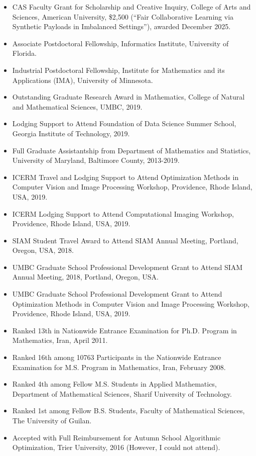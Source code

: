 \documentclass[letterpaper,11pt]{article}
\newcommand{\resitem}[1]{\item #1 \vspace{-2pt}}
\newcommand{\resheading}[1]{\par\vspace{0.6em}\noindent{\large\textbf{#1}}\par\vspace{0.25em}}
\begin{document}
\resheading{\LARGE{Honors and Awards}}
	\begin{itemize}
 \resitem{CAS Faculty Grant for Scholarship and Creative Inquiry, College of Arts and Sciences, American University, \$2{,}500 (``Fair Collaborative Learning via Synthetic Payloads in Imbalanced Settings''), awarded December 2025.}

 \resitem{Associate  Postdoctoral Fellowship, Informatics Institute, University of Florida.}
 
 \resitem{Industrial Postdoctoral Fellowship, Institute for Mathematics and its Applications (IMA), University of Minnesota.}

   \resitem{Outstanding Graduate Research Award in Mathematics, College of Natural and Mathematical Sciences, UMBC, 2019.}

\resitem{Lodging Support to Attend Foundation of Data Science Summer School,  Georgia Institute of Technology, 2019.}
        \resitem{Full Graduate Assistantship from Department of Mathematics and Statistics, University of Maryland, Baltimore County, 2013-2019.}
        \resitem{ICERM Travel and Lodging Support to Attend Optimization Methods in Computer Vision and Image Processing Workshop, Providence, Rhode Island, USA, 2019.}
        \resitem{ICERM Lodging Support to Attend Computational Imaging Workshop, Providence, Rhode Island, USA, 2019.}
        \resitem{SIAM Student Travel Award to Attend  SIAM Annual Meeting, Portland, Oregon, USA, 2018.}
        \resitem{UMBC Graduate School Professional Development Grant to  Attend SIAM Annual Meeting, 2018, Portland, Oregon, USA.}
\resitem{UMBC Graduate School Professional Development Grant to Attend Optimization Methods in Computer Vision and Image Processing Workshop, Providence, Rhode Island, USA, 2019.}
	    \resitem{Ranked 13th in Nationwide Entrance Examination for Ph.D. Program in Mathematics, Iran, April 2011.}
	    \resitem{Ranked 16th among 10763 Participants in the Nationwide Entrance Examination for M.S. Program in Mathematics, Iran, February 2008.}
        \resitem{Ranked 4th among Fellow M.S. Students in Applied Mathematics, Department of Mathematical Sciences, Sharif University of Technology.}
        \resitem{Ranked 1st among Fellow B.S. Students, Faculty of Mathematical Sciences, The University of Guilan.}
        \resitem{Accepted with Full Reimbursement for Autumn School Algorithmic Optimization, Trier University, 2016 (However, I could not attend).}
	\end{itemize}
\end{document}
